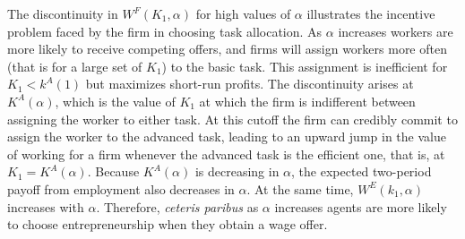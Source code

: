 \documentclass[12pt,american]{paper}
\theoremstyle{remark}
\begin{document}
%
The discontinuity in $W^F(K_1,\alpha)$ for high values of $\alpha$ illustrates the incentive problem faced by the firm in choosing task allocation. As $\alpha$ increases workers are more likely to receive competing offers, and firms will assign workers more often (that is for a large set of $K_1$) to the basic task. This assignment is inefficient for $K_1<k^A(1)$ but maximizes short-run profits. The discontinuity arises at $K^A(\alpha)$, which is the value of $K_1$ at which the firm is indifferent between assigning the worker to either task. At this cutoff the firm can credibly commit to assign the worker to the advanced task, leading to an upward jump in the value of working for a firm whenever the advanced task is the efficient one, that is, at $K_1=K^A(\alpha)$.
Because $K^A(\alpha)$ is decreasing in $\alpha$,   the  expected two-period payoff from employment  also decreases in $\alpha$. At the same time, $W^E(k_1,\alpha)$ increases with $\alpha$.   Therefore,  \textit{ceteris paribus} as $\alpha$ increases agents are more likely to choose entrepreneurship when they obtain a wage offer. %
 
\end{document}
